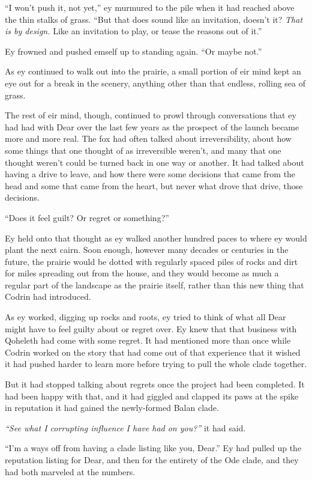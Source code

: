 ``I won't push it, not yet,'' ey murmured to the pile when it had reached above the thin stalks of grass. ``But that does sound like an invitation, doesn't it? \emph{That is by design.} Like an invitation to play, or tease the reasons out of it.''

Ey frowned and pushed emself up to standing again. ``Or maybe not.''

As ey continued to walk out into the prairie, a small portion of eir mind kept an eye out for a break in the scenery, anything other than that endless, rolling sea of grass.

The rest of eir mind, though, continued to prowl through conversations that ey had had with Dear over the last few years as the prospect of the launch became more and more real. The fox had often talked about irreversibility, about how some things that one thought of as irreversible weren't, and many that one thought weren't could be turned back in one way or another. It had talked about having a drive to leave, and how there were some decisions that came from the head and some that came from the heart, but never what drove that drive, those decisions.

``Does it feel guilt? Or regret or something?''

Ey held onto that thought as ey walked another hundred paces to where ey would plant the next cairn. Soon enough, however many decades or centuries in the future, the prairie would be dotted with regularly spaced piles of rocks and dirt for miles spreading out from the house, and they would become as much a regular part of the landscape as the prairie itself, rather than this new thing that Codrin had introduced.

As ey worked, digging up rocks and roots, ey tried to think of what all Dear might have to feel guilty about or regret over. Ey knew that that business with Qoheleth had come with some regret. It had mentioned more than once while Codrin worked on the story that had come out of that experience that it wished it had pushed harder to learn more before trying to pull the whole clade together.

But it had stopped talking about regrets once the project had been completed. It had been happy with that, and it had giggled and clapped its paws at the spike in reputation it had gained the newly-formed Balan clade.

\emph{``See what I corrupting influence I have had on you?''} it had said.

``I'm a ways off from having a clade listing like you, Dear.'' Ey had pulled up the reputation listing for Dear, and then for the entirety of the Ode clade, and they had both marveled at the numbers.

